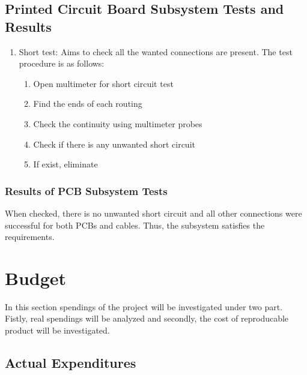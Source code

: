 \documentclass[a4paper,12pt]{article}
\begin{document}



\subsection {Printed Circuit Board Subsystem Tests and Results}
	
\begin{enumerate}

\item Short test: Aims to check all the wanted connections are present. The test procedure is as follows:

\begin{enumerate} 

\item Open multimeter for short circuit test  

\item Find the ends of each routing 

\item Check the continuity using multimeter probes

\item Check if there is any unwanted short circuit

\item If exist, eliminate

\end{enumerate}


\end{enumerate}

\subsubsection*{Results of PCB Subsystem Tests}
	When checked, there is no unwanted short circuit and all other connections were successful for both PCBs and cables. Thus, the subsystem satisfies the requirements.



\section{Budget}
		
	In this section spendings of the project will be investigated under two part. Fistly, real spendings will be analyzed and secondly, the cost of reproducable product will be investigated.

	\subsection{Actual Expenditures}
	
\end{document}

